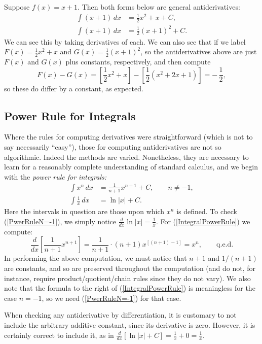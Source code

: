 \bex Suppose $f(x)=x+1$.  Then both forms below are
general antiderivatives:
\begin{align*}
\int(x+1)\,dx&=\frac12x^2+x+C,\\
\int(x+1)\,dx&=\frac12(x+1)^2+C.
\end{align*}
We can see this by taking derivatives of each.  We can also see
that if we label $F(x)=\frac12x^2+x$ and $G(x)=\frac12(x+1)^2$, 
so the antiderivatives above are just $F(x)$ and $G(x)$ plus
constants, respectively, and then compute
$$F(x)-G(x)=\left[\frac12x^2+x\right]-\left[\frac12\left(x^2+2x+1
   \right)\right]=-\,\frac12,$$
so these do differ by a constant, as expected.
\eex


\subsection{Power Rule for Integrals}
Where the rules for computing derivatives were
straightforward (which is not to say necessarily ``easy''),
those for computing antiderivatives are not so algorithmic.
Indeed the methods are varied.  Nonetheless, they are necessary
to learn for a reasonably complete understanding of standard
calculus, and we begin with the {\it power rule for integrals:}
\begin{align}
\int x^n\,dx&=\frac1{n+1}x^{n+1}+C,\qquad n\ne-1,\label{IntegralPowerRule}\\
\int \frac1x\,dx&=\ln|x|+C.\label{PwerRuleN=-1}
\end{align}
Here the intervals in question are those upon which $x^n$ is
defined.  To check (\ref{PwerRuleN=-1}), we simply
notice $\frac{d}{dx}\ln|x|=\frac1x$.
For (\ref{IntegralPowerRule})
we compute:
$$\frac{d}{dx}\left[\frac1{n+1}x^{n+1}\right]
=\frac1{n+1}\cdot(n+1)x^{[(n+1)-1]}=x^n,\qquad\text{q.e.d.}$$
In performing the above computation, 
we must notice that $n+1$ and $1/(n+1)$ are constants,
and so are preserved throughout the computation (and do
not, for instance, require product/quotient/chain rules since they do not
vary).
We also note that the formula to the right of (\ref{IntegralPowerRule})
is meaningless for the case $n=-1$, so we need
(\ref{PwerRuleN=-1}) for that case.  

When checking any antiderivative by differentiation, it is customary to 
not include the arbitrary additive constant, since its derivative is zero.
However, it is certainly correct to include it, as in
$\frac{d}{dx}\left[\ln|x|+C\right]=\frac1x+0=\frac1x$.


